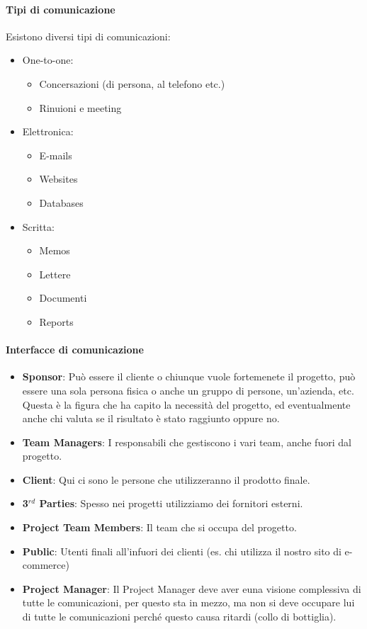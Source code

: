 \paragraph{Tipi di comunicazione}
Esistono diversi tipi di comunicazioni:
\begin{itemize}
	\item One-to-one:
	\begin{itemize}
		\item Concersazioni (di persona, al telefono etc.)
		\item Rinuioni e meeting
	\end{itemize}
	\item Elettronica:
	\begin{itemize}
		\item E-mails
		\item Websites
		\item Databases
	\end{itemize}
	\item Scritta:
	\begin{itemize}
		\item Memos
		\item Lettere
		\item Documenti
		\item Reports
	\end{itemize}
\end{itemize}
\paragraph{Interfacce di comunicazione}
\begin{itemize}
	\item \textbf{Sponsor}: Può essere il cliente o chiunque vuole fortemenete il progetto, può essere una sola persona fisica o anche un gruppo di persone, un'azienda, etc.\newline
	Questa è la figura che ha capito la necessità del progetto, ed eventualmente anche chi valuta se il risultato è stato raggiunto oppure no.
	\item \textbf{Team Managers}: I responsabili che gestiscono i vari team, anche fuori dal progetto.
	\item \textbf{Client}: Qui ci sono le persone che utilizzeranno il prodotto finale.
	\item \textbf{3$^{rd}$ Parties}: Spesso nei progetti utilizziamo dei fornitori esterni.
	\item \textbf{Project Team Members}: Il team che si occupa del progetto.
	\item \textbf{Public}: Utenti finali all'infuori dei clienti (es. chi utilizza il nostro sito di e-commerce)
	\item \textbf{Project Manager}: Il Project Manager deve aver euna visione complessiva di tutte le comunicazioni, per questo sta in mezzo, ma non si deve occupare lui di tutte le comunicazioni perché questo causa ritardi (collo di bottiglia).
\end{itemize}
